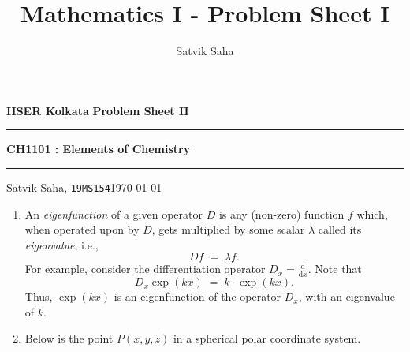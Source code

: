 \documentclass[10pt]{article}
\title{Mathematics I - Problem Sheet I}
\author{Satvik Saha}
\date{}
\begin{document}
        \par\textbf{IISER Kolkata} \hfill \textbf{Problem Sheet II}
        \vspace{3pt}
        \hrule
        \vspace{3pt}
        \begin{center}
                \LARGE{\textbf{CH1101 : Elements of Chemistry}}
        \end{center}
        \vspace{3pt}
        \hrule
        \vspace{3pt}
        Satvik Saha, \texttt{19MS154}\hfill\today
        \vspace{20pt}

        \begin{enumerate}
                \item An \textit{eigenfunction} of a given operator $D$ is any (non-zero) function $f$ which, when operated upon by $D$,
                        gets multiplied by some scalar $\lambda$ called its \textit{eigenvalue}, i.e.,
                        \[
                                Df \;=\; \lambda f.
                        \]
                        For example, consider the differentiation operator $D_x = \frac{\mathrm{d} }{\mathrm{d}x}$. Note that
                        \[
                                D_x \exp(kx) \;=\; k \cdot\exp(kx).
                        \]
                        Thus, $\exp(kx)$ is an eigenfunction of the operator $D_x$, with an eigenvalue of $k$.
                
                \item Below is the point $P(x, y, z)$ in a spherical polar coordinate system.
                        \begin{center}
\end{center}
\end{enumerate}
\end{document}
